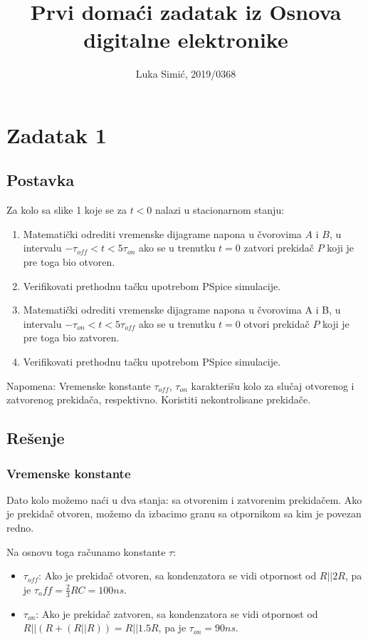 \documentclass{article}
\title{Prvi domaći zadatak iz Osnova digitalne elektronike}
\author{Luka Simić, 2019/0368}
\date{}
\begin{document}
    \begin{titlepage}
        \maketitle
        \vspace*{\fill}
        \tableofcontents
    \end{titlepage}

    \section{Zadatak 1}
        \subsection{Postavka}
            Za kolo sa slike 1 koje se za $t < 0$ nalazi u stacionarnom stanju:
            \begin{enumerate}[label=(\alph*)]
                \item Matematički odrediti vremenske dijagrame napona u čvorovima $A$ i $B$, u intervalu $-\tau_{off} < t < 5\tau_{on}$ ako se u trenutku $t = 0$ zatvori prekidač $P$ koji je pre toga bio otvoren.
                \item Verifikovati prethodnu tačku upotrebom PSpice simulacije.
                \item Matematički odrediti vremenske dijagrame napona u čvorovima A i B, u intervalu $-\tau_{on} < t < 5\tau_{off}$ ako se u trenutku $t = 0$ otvori prekidač $P$ koji je pre toga bio zatvoren.
                \item Verifikovati prethodnu tačku upotrebom PSpice simulacije.
            \end{enumerate}
            Napomena: Vremenske konstante $\tau_{off}$, $\tau_{on}$ karakterišu kolo za slučaj otvorenog i zatvorenog prekidača, respektivno. Koristiti nekontrolisane prekidače.
        \subsection{Rešenje}
            \subsubsection{Vremenske konstante}
                Dato kolo možemo naći u dva stanja: sa otvorenim i zatvorenim prekidačem. Ako je prekidač otvoren, možemo da izbacimo granu sa otpornikom sa kim je povezan redno.

                Na osnovu toga računamo konstante $\tau$:
                \begin{itemize}
                    \item $\tau_{off}$: Ako je prekidač otvoren, sa kondenzatora se vidi otpornost od $R || 2R$, pa je $\tau_off = \frac{2}{3}RC = 100ns$.
                    \item $\tau_{on}$: Ako je prekidač zatvoren, sa kondenzatora se vidi otpornost od $R || (R + (R || R)) = R || 1.5R$, pa je $\tau_{on} = 90ns$.
                \end{itemize}
\end{document}
